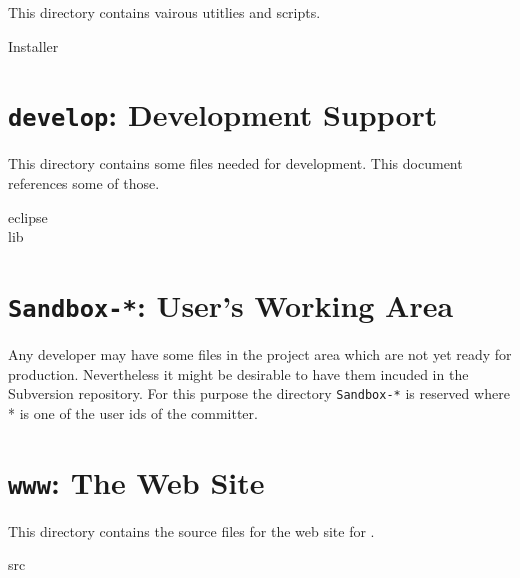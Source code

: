 This directory contains vairous utitlies and scripts.

\begin{description}
\item[Installer] 
\end{description}

\section{\texttt{develop}: Development Support}

This directory contains some files needed for development. This
document references some of those.

\begin{description}
\item[eclipse] 
\item[lib] 
\end{description}

\section{\texttt{Sandbox-*}: User's Working Area}

Any developer may have some files in the project area which are not
yet ready for production. Nevertheless it might be desirable to have
them incuded in the Subversion repository.  For this purpose the
directory \texttt{Sandbox-*} is reserved where * is one of the user
ids of the committer.

\section{\texttt{www}: The Web Site}

This directory contains the source files for the web site for \ExTeX.

\begin{description}
\item[src] 
\end{description}

